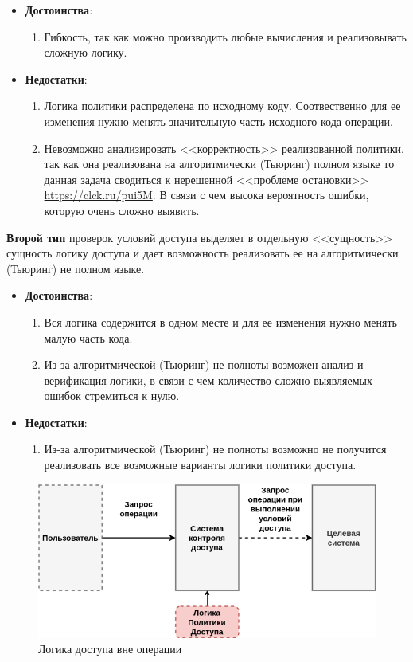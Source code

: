 \begin{itemize}
	\item \textbf{Достоинства}:
	\begin{enumerate}
		\item Гибкость, так как можно производить любые вычисления и реализовывать сложную логику.
	\end{enumerate}
	\item \textbf{Недостатки}:
	\begin{enumerate}
		\item Логика политики распределена по исходному коду. Соотвественно для ее изменения нужно менять значительную часть исходного кода операции.
		\item Невозможно анализировать <<корректность>> реализованной политики, так как она реализована на алгоритмически (Тьюринг) полном языке то данная задача сводиться к нерешенной <<проблеме остановки>> \url{https://clck.ru/pui5M}. В связи с чем высока вероятность ошибки, которую очень сложно выявить.
	\end{enumerate}
\end{itemize}


\textbf{Второй тип} проверок условий доступа выделяет в отдельную <<сущность>> сущность логику доступа и дает возможность реализовать ее на алгоритмически (Тьюринг) не полном языке.
\begin{itemize}
	\item \textbf{Достоинства}:
	\begin{enumerate}
		\item Вся логика содержится в одном месте и для ее изменения нужно менять малую часть кода.
		\item Из-за алгоритмической (Тьюринг) не полноты возможен анализ и верификация логики, в связи с чем количество сложно выявляемых ошибок стремиться к нулю.
	\end{enumerate}
	\item \textbf{Недостатки}:
	\begin{enumerate}
		\item Из-за алгоритмической (Тьюринг) не полноты возможно не получится реализовать все возможные варианты логики политики доступа.
	\end{enumerate}
\end{itemize}

\begin{figure}[H]
	\centering
	\includegraphics[scale = 0.7]{25/AC_out.png}
	\caption{Логика доступа вне операции}
	\label{fig:ac_out}
\end{figure}

